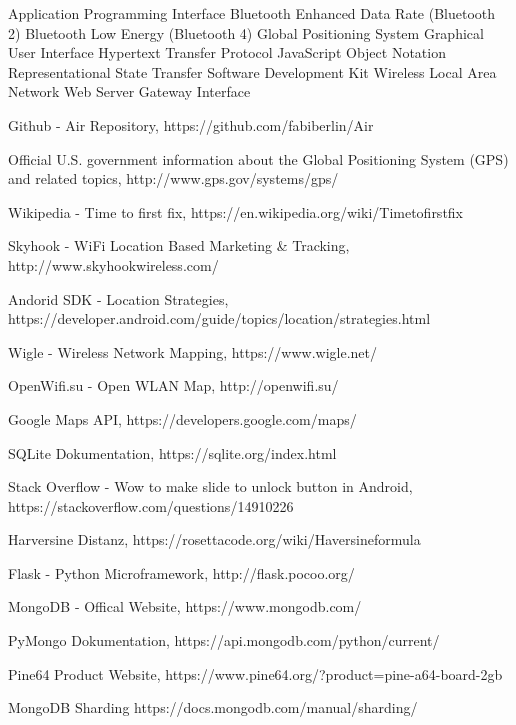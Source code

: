 \documentclass[11pt,a4paper]{article}
\begin{document}
\begin{acronym}
		{Application Programming Interface}
	{Bluetooth Enhanced Data Rate (Bluetooth 2)} 
	{Bluetooth Low Energy (Bluetooth 4)}
		{Global Positioning System}
		{Graphical User Interface }
		{Hypertext Transfer Protocol}
		{JavaScript Object Notation}
		{Representational State Transfer}
		{Software Development Kit}
		{Wireless Local Area Network}
		{Web Server Gateway Interface}

\end{acronym}

\newpage
\begin{thebibliography}{99}

 Github - Air Repository, https://github.com/fabiberlin/Air

 Official U.S. government information about the Global Positioning System (GPS) and related topics, http://www.gps.gov/systems/gps/

 Wikipedia - Time to first fix, https://en.wikipedia.org/wiki/Time\textunderscore to\textunderscore first\textunderscore fix

 Skyhook - WiFi Location Based Marketing \& Tracking, http://www.skyhookwireless.com/

 Andorid SDK - Location Strategies, https://developer.android.com/guide/topics/location/strategies.html

 Wigle - Wireless Network Mapping, https://www.wigle.net/

 OpenWifi.su - Open WLAN Map, http://openwifi.su/

 Google Maps API, https://developers.google.com/maps/

 SQLite Dokumentation, https://sqlite.org/index.html

 Stack Overflow - Wow to make slide to unlock button in Android, https://stackoverflow.com/questions/14910226

 Harversine Distanz, 
https://rosettacode.org/wiki/Haversine\textunderscore formula

 Flask - Python Microframework,  http://flask.pocoo.org/

 MongoDB - Offical Website, https://www.mongodb.com/

 PyMongo Dokumentation, https://api.mongodb.com/python/current/

 Pine64 Product Website, https://www.pine64.org/?product=pine-a64-board-2gb

 MongoDB Sharding https://docs.mongodb.com/manual/sharding/


\end{thebibliography}
\end{document}
